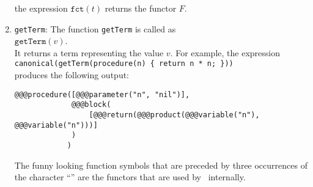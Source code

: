 \begin{enumerate}
      the expression $\mathtt{fct}(t)$ returns the functor $F$.
\item \texttt{getTerm}: The function \texttt{getTerm}  is called as
      \\[0.2cm]
      \hspace*{1.3cm}
      $\mathtt{getTerm}(v)$.
      \\[0.2cm]
      It returns a term representing the value $v$.  
      For example, the expression
      \\[0.2cm]
      \hspace*{1.3cm}
      \texttt{canonical(getTerm(procedure(n) \{ return n * n; \}))}
      \\[0.2cm]
      produces the following output:
\begin{verbatim}
@@@procedure([@@@parameter("n", "nil")], 
             @@@block(
                 [@@@return(@@@product(@@@variable("n"), @@@variable("n")))]
             )
            )
\end{verbatim}
      The funny looking function symbols that are preceded by three occurrences of the character
      ``\texttt{}'' are the functors that are used by \setlx\ internally.


\end{enumerate}
